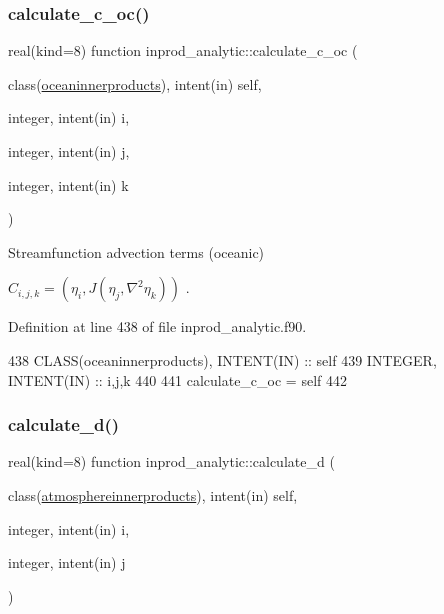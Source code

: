 \subsubsection{\texorpdfstring{calculate\+\_\+c\+\_\+oc()}{calculate\_c\_oc()}}
{\footnotesize\ttfamily real(kind=8) function inprod\+\_\+analytic\+::calculate\+\_\+c\+\_\+oc (\begin{DoxyParamCaption}\item[{class(\hyperlink{structinprod__analytic_1_1oceaninnerproducts}{oceaninnerproducts}), intent(in)}]{self,  }\item[{integer, intent(in)}]{i,  }\item[{integer, intent(in)}]{j,  }\item[{integer, intent(in)}]{k }\end{DoxyParamCaption})\hspace{0.3cm}{\ttfamily [private]}}



Streamfunction advection terms (oceanic) 

$ C_{i,j,k} = (\eta_i, J(\eta_j,\nabla^2 \eta_k))$ . 

Definition at line 438 of file inprod\+\_\+analytic.\+f90.


\begin{DoxyCode}
438     \textcolor{keywordtype}{CLASS}(oceaninnerproducts), \textcolor{keywordtype}{INTENT(IN)} :: self
439     \textcolor{keywordtype}{INTEGER}, \textcolor{keywordtype}{INTENT(IN)} :: i,j,k
440 
441     calculate\_c\_oc = self%
442 
\end{DoxyCode}
\mbox{\label{namespaceinprod__analytic_ab270711bbfe233c1182dca363f80ec41}} 
\subsubsection{\texorpdfstring{calculate\+\_\+d()}{calculate\_d()}}
{\footnotesize\ttfamily real(kind=8) function inprod\+\_\+analytic\+::calculate\+\_\+d (\begin{DoxyParamCaption}\item[{class(\hyperlink{structinprod__analytic_1_1atmosphereinnerproducts}{atmosphereinnerproducts}), intent(in)}]{self,  }\item[{integer, intent(in)}]{i,  }\item[{integer, intent(in)}]{j }\end{DoxyParamCaption})\hspace{0.3cm}{\ttfamily [private]}}



